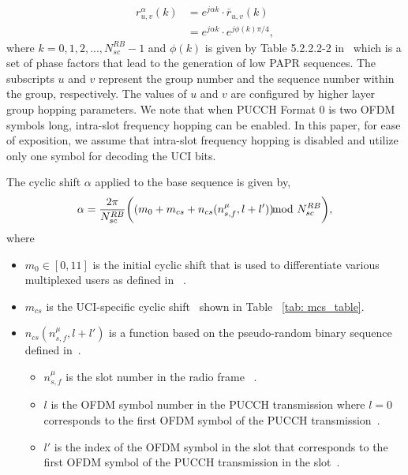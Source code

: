 \documentclass[journal]{IEEEtran}
\begin{document}
\begin{equation}
\begin{split}
    r_{u,v}^{\alpha}(k) & = e^{j\alpha k}\cdot\bar{r}_{u,v} (k) \\
                                 & = e^{j\alpha k}\cdot e^{j\phi (k) \pi /4},
\end{split}
\label{eq: rotated_base_seq}
\end{equation}
where $k = 0,1,2,..., N_{sc}^{RB}-1$ and $\phi(k)$ is given by Table 5.2.2.2-2 in~\cite{3gpp_38_211} which is a set of phase factors that lead to the generation of low PAPR sequences. The subscripts $u$ and $v$ represent the group number and the sequence number within the group, respectively. The values of $u$ and $v$ are configured by higher layer group hopping parameters. We note that when PUCCH Format 0 is two OFDM symbols long, intra-slot frequency hopping can be enabled. In this paper, for ease of exposition, we assume that intra-slot frequency hopping is disabled and utilize only one symbol for decoding the UCI bits.

The cyclic shift $\alpha$ applied to the base sequence is given by,
\begin{equation}
    \alpha = \frac{2\pi}{N_{sc}^{RB}}\bigg((m_{0} + m_{cs} + n_{cs}(n_{s,f}^{\mu},l+l'))\hspace{-8pt}\mod N_{sc}^{RB} \bigg),
    \label{eq: alpha}
\end{equation}
where 
\begin{itemize}
    \item $m_{0}\in [0,11]$ is the initial cyclic shift that is used to differentiate various multiplexed users as defined in ~\cite{3gpp_38_211}. 
    \item $m_{cs}$ is the UCI-specific cyclic shift~\cite{3gpp_38_211} shown in Table ~\ref{tab: mcs_table}. 
    \item $n_{cs}(n_{s,f}^{\mu},l+l')$ is a function based on the pseudo-random binary sequence defined in~\cite{3gpp_38_211}.
    \begin{itemize}
    \item $n_{s,f}^{\mu}$ is the slot number in the radio frame ~\cite{3gpp_38_211}.
    \item $l$ is the OFDM symbol number in the PUCCH transmission where $l=0$ corresponds to the first OFDM symbol of the PUCCH transmission~\cite{3gpp_38_211, 3gpp_38_213}.
    \item $l'$ is the index of the OFDM symbol in the slot that corresponds to the first OFDM symbol of the PUCCH transmission in the slot~\cite{3gpp_38_211, 3gpp_38_213}.
    \end{itemize}
\end{itemize} 
\end{document}
